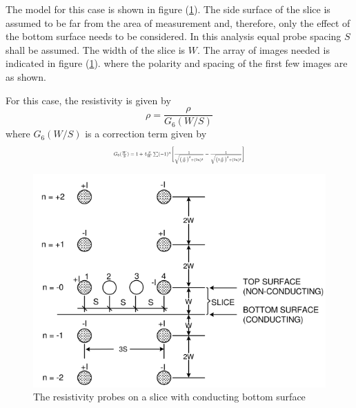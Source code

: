 \documentclass[%
 aip,
 amsmath,amssymb,
 reprint,%
]{revtex4-1}
\begin{document}
\par
The model for this case is shown in figure (\ref{fig:images}). The side surface of the slice is assumed to
be far from the area of measurement and, therefore, only the effect of the bottom surface
needs to be considered. In this analysis equal probe spacing $S$ shall be assumed. The width of
the slice is $W$. The array of images needed is indicated in figure (\ref{fig:images}). where the polarity and
spacing of the first few images are as shown.
\par
For this case, the resistivity is given by
\begin{equation}
    \rho = \dfrac{\rho}{G_6 (W/S)}
\end{equation}
where $G_6(W/S)$ is a correction term given by
\begin{equation}
\resizebox{0.4\textwidth}{!}{$G_6 (\frac{W}{S}) = 1 + 4 \frac{S}{W} \sum(-1)^{n}
        \Bigg[ \frac{1}{\sqrt{\big(\frac{S}{W} \big)^2 + (2n)^2}} - \frac{1}{\sqrt{\big(2 \frac{S}{W} \big)^2 + (2n)^2}}\Bigg]$}
\end{equation}

\begin{figure}
    \centering
    \includegraphics[scale = 0.7]{Figures/images.png}
    \caption{The resistivity probes on a slice with conducting bottom
surface}
    \label{fig:images}
\end{figure}
\end{document}
